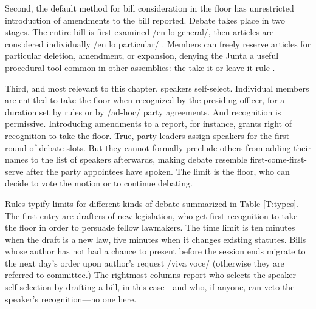 \documentclass[letter,12pt]{article}
\begin{document}
Second, the default method for bill consideration in the floor has unrestricted introduction of amendments to the bill reported. Debate takes place in two stages. The entire bill is first examined /en lo general/, then articles are considered individually /en lo particular/ \citep[see][]{heller.weldon.2003}. Members can freely reserve articles for particular deletion, amendment, or expansion, denying the Junta a useful procedural tool common in other assemblies: the take-it-or-leave-it rule \citep[eg.,][]{cox.2006,dion.huber.1996}.

Third, and most relevant to this chapter, speakers self-select. Individual members are entitled to take the floor when recognized by the presiding officer, for a duration set by rules or by /ad-hoc/ party agreements. And recognition is permissive. Introducing amendments to a report, for instance, grants right of recognition to take the floor. True, party leaders assign speakers for the first round of debate slots. But they cannot formally preclude others from adding their names to the list of speakers afterwards, making debate resemble first-come-first-serve after the party appointees have spoken. The limit is the floor, who can decide to vote the motion or to continue debating. 



Rules typify limits for different kinds of debate summarized in Table \ref{T:types}. The first entry are drafters of new legislation, who get first recognition to take the floor in order to persuade fellow lawmakers. The time limit is ten minutes when the draft is a new law, five minutes when it changes existing statutes. Bills whose author has not had a chance to present before the session ends migrate to the next day's order upon author's request /viva voce/ (otherwise they are referred to committee.) The rightmost columns report who selects the speaker---self-selection by drafting a bill, in this case---and who, if anyone, can veto the speaker's recognition---no one here. %
\end{document}
